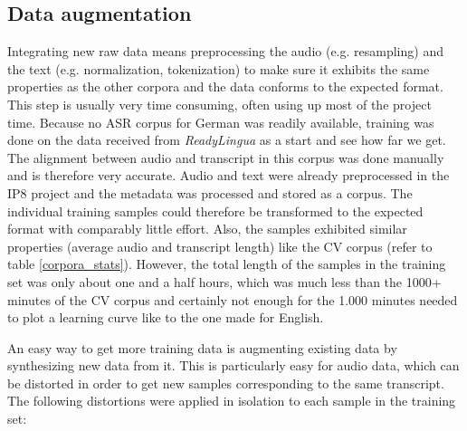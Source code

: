 \subsection{Data augmentation}

Integrating new raw data means preprocessing the audio (e.g. resampling) and the text (e.g. normalization, tokenization) to make sure it exhibits the same properties as the other corpora and the data conforms to the expected format. This step is usually very time consuming, often using up most of the project time. Because no ASR corpus for German was readily available, training was done on the data received from \textit{ReadyLingua} as a start and see how far we get. The alignment between audio and transcript in this corpus was done manually and is therefore very accurate. Audio and text were already preprocessed in the IP8 project and the metadata was processed and stored as a corpus. The individual training samples could therefore be transformed to the expected format with comparably little effort. Also, the samples exhibited similar properties (average audio and transcript length) like the \ac{CV} corpus (refer to table \ref{corpora_stats}). However, the total length of the samples in the training set was only about one and a half hours, which was much less than the 1000+ minutes of the \ac{CV} corpus and certainly not enough for the 1.000 minutes needed to plot a learning curve like to the one made for English. 

An easy way to get more training data is augmenting existing data by synthesizing new data from it. This is particularly easy for audio data, which can be distorted in order to get new samples corresponding to the same transcript. The following distortions were applied in isolation to each sample in the training set:

